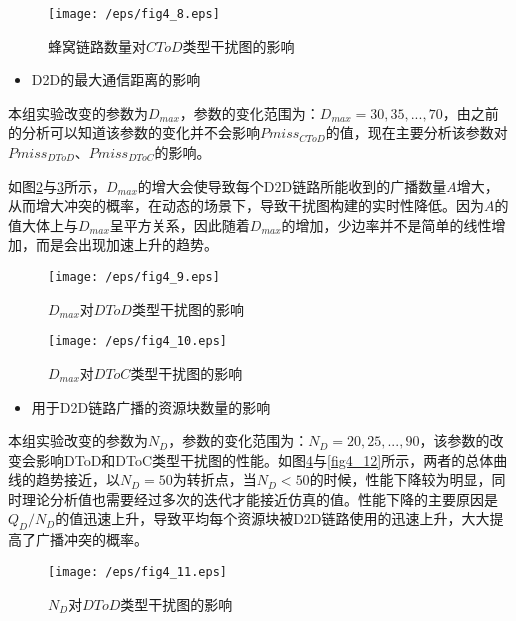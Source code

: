 \documentclass[figurelist,tablelist,algorithmlist,nomlist,masters]{seuthesix}
\begin{document}
	\begin{figure}[!h]
		\centering
		\texttt{[image: /eps/fig4\_8.eps]}
		\caption{蜂窝链路数量对$CToD$类型干扰图的影响}
		\label{fig4_8}
	\end{figure}
	
	
	\begin{itemize}
		\item D2D的最大通信距离的影响
	\end{itemize}
	
	本组实验改变的参数为$D_{max}$，参数的变化范围为：$D_{max} = 30,35,...,70$，由之前的分析可以知道该参数的变化并不会影响$Pmiss_{CToD}$的值，现在主要分析该参数对$Pmiss_{DToD}$、$Pmiss_{DToC}$的影响。
	
	如图\ref{fig4_9}与\ref{fig4_10}所示，$D_{max}$的增大会使导致每个D2D链路所能收到的广播数量$A$增大，从而增大冲突的概率，在动态的场景下，导致干扰图构建的实时性降低。因为$A$的值大体上与$D_{max}$呈平方关系，因此随着$D_{max}$的增加，少边率并不是简单的线性增加，而是会出现加速上升的趋势。
	
	\begin{figure}[!h]
		\centering
		\texttt{[image: /eps/fig4\_9.eps]}
		\caption{$D_{max}$对$DToD$类型干扰图的影响}
		\label{fig4_9}
	\end{figure}
	
	\begin{figure}[!h]
		\centering
		\texttt{[image: /eps/fig4\_10.eps]}
		\caption{$D_{max}$对$DToC$类型干扰图的影响}
		\label{fig4_10}
	\end{figure}
	
	
	\begin{itemize}
		\item 用于D2D链路广播的资源块数量的影响
	\end{itemize}
	
	本组实验改变的参数为$N_{D}$，参数的变化范围为：$N_{D} = 20,25,...,90$，该参数的改变会影响DToD和DToC类型干扰图的性能。如图\ref{fig4_11}与\ref{fig4_12}所示，两者的总体曲线的趋势接近，以$N_{D} = 50$为转折点，当$N_{D} < 50$的时候，性能下降较为明显，同时理论分析值也需要经过多次的迭代才能接近仿真的值。性能下降的主要原因是$Q_{D} / N_{D}$的值迅速上升，导致平均每个资源块被D2D链路使用的迅速上升，大大提高了广播冲突的概率。
	
	\begin{figure}[!h]
		\centering
		\texttt{[image: /eps/fig4\_11.eps]}
		\caption{$N_D$对$DToD$类型干扰图的影响}
		\label{fig4_11}
	\end{figure}
	
\end{document}
